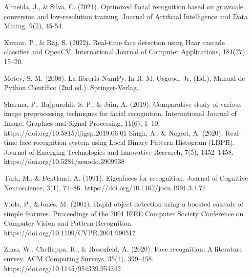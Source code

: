 \documentclass[12pt]{article}
\begin{document}
{Almeida, J., \& Silva, C. (2021). Optimized facial recognition based on grayscale conversion and low-resolution training. Journal of Artificial Intelligence and Data Mining, 9(2), 45-54. 

Kumar, P., \& Raj, S. (2022). Real-time face detection using Haar cascade classifier and OpenCV. International Journal of Computer Applications, 184(27), 15–20. 

Metev, S. M. (2008). La librería NumPy. In R. M. Osgood, Jr. (Ed.), Manual de Python Científico (2nd ed.). Springer-Verlag.

Sharma, P., Rajpurohit, S. P., \& Jain, A. (2019). Comparative study of various image preprocessing techniques for facial recognition. International Journal of Image, Graphics and Signal Processing, 11(6), 1–10. https://doi.org/10.5815/ijigsp.2019.06.01
Singh, A., \& Nagori, A. (2020). Real-time face recognition system using Local Binary Pattern Histogram (LBPH). Journal of Emerging Technologies and Innovative Research, 7(5), 1452–1458. https://doi.org/10.5281/zenodo.3909938

Turk, M., \& Pentland, A. (1991). Eigenfaces for recognition. Journal of Cognitive Neuroscience, 3(1), 71–86. https://doi.org/10.1162/jocn.1991.3.1.71

Viola, P., \&Jones, M. (2001). Rapid object detection using a boosted cascade of simple features. Proceedings of the 2001 IEEE Computer Society Conference on Computer Vision and Pattern Recognition. https://doi.org/10.1109/CVPR.2001.990517


Zhao, W., Chellappa, R., \& Rosenfeld, A. (2020). Face recognition: A literature survey. ACM Computing Surveys, 35(4), 399–458. https://doi.org/10.1145/954339.954342

}
\end{document}
